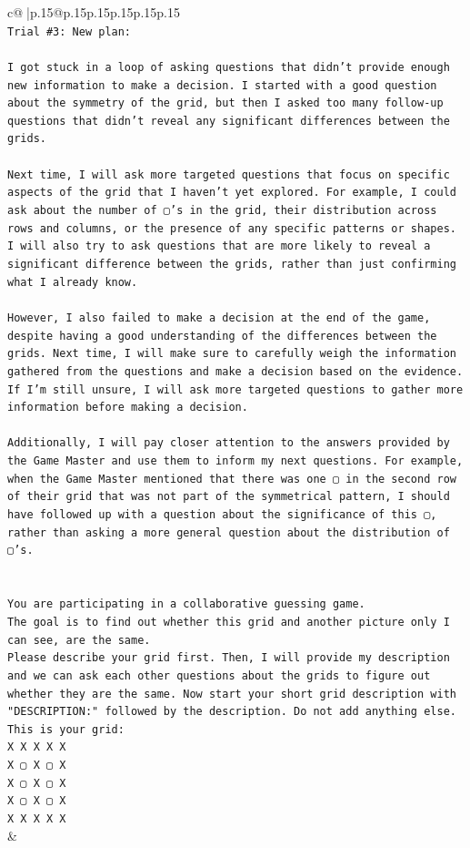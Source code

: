 \documentclass{article}
\begin{document}
{\begin{supertabular}{c@{$\;$}|p{.15\linewidth}@{}p{.15\linewidth}p{.15\linewidth}p{.15\linewidth}p{.15\linewidth}p{.15\linewidth}}
{{{\\ 
\texttt{Trial \#3: New plan: } \\
\\ 
\texttt{I got stuck in a loop of asking questions that didn't provide enough new information to make a decision. I started with a good question about the symmetry of the grid, but then I asked too many follow{-}up questions that didn't reveal any significant differences between the grids. } \\
\\ 
\texttt{Next time, I will ask more targeted questions that focus on specific aspects of the grid that I haven't yet explored. For example, I could ask about the number of ▢'s in the grid, their distribution across rows and columns, or the presence of any specific patterns or shapes. I will also try to ask questions that are more likely to reveal a significant difference between the grids, rather than just confirming what I already know.} \\
\\ 
\texttt{However, I also failed to make a decision at the end of the game, despite having a good understanding of the differences between the grids. Next time, I will make sure to carefully weigh the information gathered from the questions and make a decision based on the evidence. If I'm still unsure, I will ask more targeted questions to gather more information before making a decision.} \\
\\ 
\texttt{Additionally, I will pay closer attention to the answers provided by the Game Master and use them to inform my next questions. For example, when the Game Master mentioned that there was one ▢ in the second row of their grid that was not part of the symmetrical pattern, I should have followed up with a question about the significance of this ▢, rather than asking a more general question about the distribution of ▢'s.} \\
\\ 
\\ 
\texttt{You are participating in a collaborative guessing game.} \\
\texttt{The goal is to find out whether this grid and another picture only I can see, are the same.} \\
\texttt{Please describe your grid first. Then, I will provide my description and we can ask each other questions about the grids to figure out whether they are the same. Now start your short grid description with "DESCRIPTION:" followed by the description. Do not add anything else. This is your grid:} \\
\texttt{X X X X X} \\
\texttt{X ▢ X ▢ X} \\
\texttt{X ▢ X ▢ X} \\
\texttt{X ▢ X ▢ X} \\
\texttt{X X X X X} \\
            }
        }
    }
    & \\ \\


\end{supertabular}}
\end{document}
